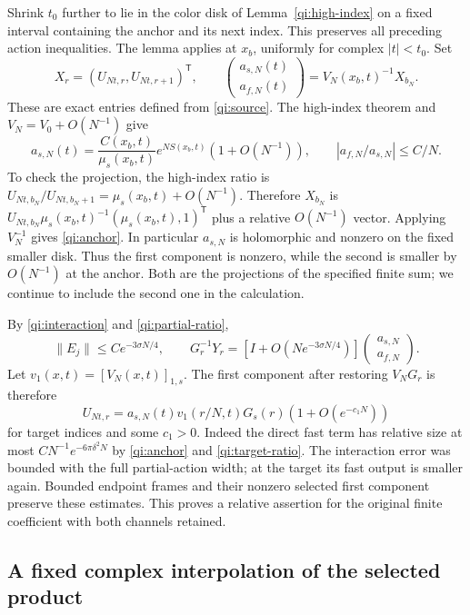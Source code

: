 Shrink $t_0$ further to lie in the color disk of
Lemma~\ref{qi:high-index} on a fixed interval containing the anchor
and its next index. This preserves all preceding action inequalities.
The lemma applies at $x_b$, uniformly for complex $|t|<t_0$. Set
\[
 X_r=(U_{Nt,r},U_{Nt,r+1})^{\mathsf T},\qquad
 \begin{pmatrix}a_{s,N}(t)\\a_{f,N}(t)\end{pmatrix}
       =V_N(x_b,t)^{-1}X_{b_N}.
\]
These are exact entries defined from \eqref{qi:source}. The high-index theorem and $V_N=V_0+O(N^{-1})$ give
\begin{equation}\label{qi:anchor}
 a_{s,N}(t)=
 \frac{C(x_b,t)}{\mu_s(x_b,t)}
       e^{NS(x_b,t)}(1+O(N^{-1})),\qquad
 |a_{f,N}/a_{s,N}|\le C/N.
\end{equation}
To check the projection, the high-index ratio is
$U_{Nt,b_N}/U_{Nt,b_N+1}=\mu_s(x_b,t)+O(N^{-1})$.
Therefore $X_{b_N}$ is
$U_{Nt,b_N}\mu_s(x_b,t)^{-1}(\mu_s(x_b,t),1)^{\mathsf T}$
plus a relative $O(N^{-1})$ vector. Applying $V_N^{-1}$ gives
\eqref{qi:anchor}. In particular $a_{s,N}$ is holomorphic and nonzero on the fixed smaller disk. Thus the first component is nonzero, while the second is smaller by
$O(N^{-1})$ at the anchor. Both are the projections of the specified
finite sum; we continue to include the second one in the calculation.

By \eqref{qi:interaction} and \eqref{qi:partial-ratio},
\[
 \|E_j\|\le C e^{-3\sigma N/4},\qquad
 G_r^{-1}Y_r=
 \left[I+O(Ne^{-3\sigma N/4})\right]
       \begin{pmatrix}a_{s,N}\\a_{f,N}\end{pmatrix}.
\]
Let $v_1(x,t)=[V_N(x,t)]_{1,s}$. The first component after restoring $V_NG_r$ is therefore
\begin{equation}\label{qi:selected-source}
 U_{Nt,r}=a_{s,N}(t)v_1(r/N,t)G_s(r)
                 (1+O(e^{-c_1N}))
\end{equation}
for target indices and some $c_1>0$.
Indeed the direct fast term has relative size at most
$C N^{-1}e^{-6\pi\delta^2N}$ by \eqref{qi:anchor} and \eqref{qi:target-ratio}. The interaction error was bounded with the full partial-action width; at the target its fast output is smaller again. Bounded endpoint frames and their nonzero selected first component preserve these estimates. This proves a relative assertion for the original finite coefficient with both channels retained.

\subsection{A fixed complex interpolation of the selected product}


